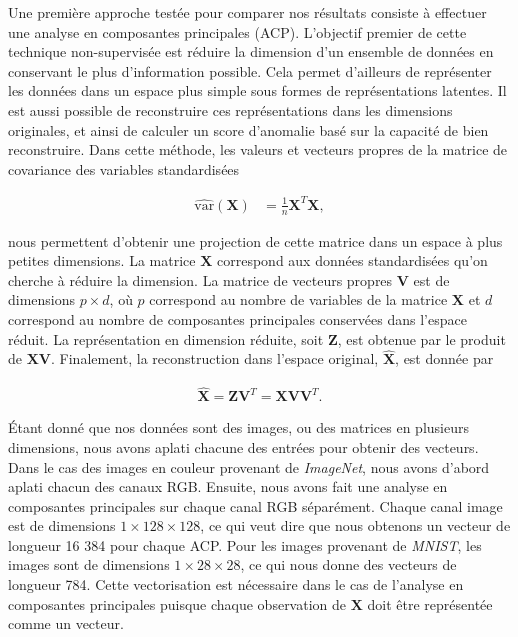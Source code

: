 Une première approche testée pour comparer nos résultats consiste à effectuer une analyse en composantes principales (ACP). L'objectif premier de cette technique non-supervisée est réduire la dimension d'un ensemble de données en conservant le plus d'information possible. Cela permet d'ailleurs de représenter les données dans un espace plus simple sous formes de représentations latentes. Il est aussi possible de reconstruire ces représentations dans les dimensions originales, et ainsi de calculer un score d'anomalie basé sur la capacité de bien reconstruire. Dans cette méthode, les valeurs et vecteurs propres de la matrice de covariance des variables standardisées 

\begin{equation} \label{eq1}
	\begin{split}
		\hat{\text{var}}(\mathbf{X}) & = \frac{1}{n}\mathbf{X}^{T}\mathbf{X},
	\end{split}
\end{equation}


nous permettent d'obtenir une projection de cette matrice dans un espace à plus petites dimensions. La matrice $\mathbf{X}$ correspond aux données standardisées qu'on cherche à réduire la dimension. La matrice de vecteurs propres $\mathbf{V}$ est de dimensions $p \times d$, où $p$ correspond au nombre de variables de la matrice $\mathbf{X}$ et $d$ correspond au nombre de composantes principales conservées dans l'espace réduit. La représentation en dimension réduite, soit $\mathbf{Z}$, est obtenue par le produit de $\mathbf{X}\mathbf{\mathbf{V}}$. Finalement, la reconstruction dans l'espace original, $\hat{\mathbf{X}}$, est donnée par

\begin{gather*}
	\hat{\mathbf{X}} = \mathbf{Z}\mathbf{V}^{T}=\mathbf{X}\mathbf{V}\mathbf{V}^{T}.
\end{gather*}

Étant donné que nos données sont des images, ou des matrices en plusieurs dimensions, nous avons aplati chacune des entrées pour obtenir des vecteurs. Dans le cas des images en couleur provenant de \textit{ImageNet}, nous avons d'abord aplati chacun des canaux RGB. Ensuite, nous avons fait une analyse en composantes principales sur chaque canal RGB séparément. Chaque canal image est de dimensions $1 \times 128 \times 128$, ce qui veut dire que nous obtenons un vecteur de longueur 16 384 pour chaque ACP. Pour les images provenant de \textit{MNIST}, les images sont de dimensions $1 \times 28 \times 28$, ce qui nous donne des vecteurs de longueur 784. Cette vectorisation est nécessaire dans le cas de l'analyse en composantes principales puisque chaque observation de $\mathbf{X}$ doit être représentée comme un vecteur.

